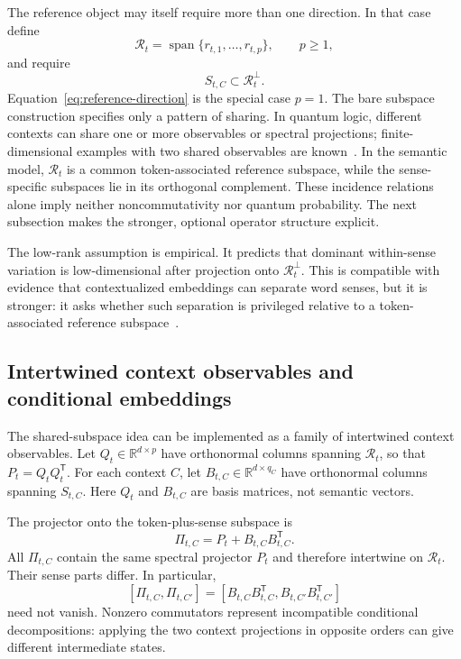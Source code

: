 \documentclass[
  aps,
  reprint,
  superscriptaddress,
  floatfix,
  nofootinbib,
  longbibliography
]{revtex4-2}
\newcommand{\R}{\mathbb{R}}
\newcommand{\T}{^{\mathsf{T}}}
\DeclareMathOperator{\spanop}{span}
\begin{document}
The reference object may itself require more than one direction. In that
case define
%
\begin{equation}
\label{eq:reference-subspace}
\mathcal R_t=
\spanop\{r_{t,1},\dots,r_{t,p}\},
\qquad p\ge1,
\end{equation}
%
and require
%
\begin{equation}
\label{eq:multi-sense-subspace}
S_{t,C}\subset\mathcal R_t^\perp .
\end{equation}
%
Equation~\eqref{eq:reference-direction} is the special case $p=1$.
The bare subspace construction specifies only a pattern of sharing. In
quantum logic, different contexts can share one or more observables or
spectral projections; finite-dimensional examples with two shared
observables are known~\cite{svozil:040102}. In the semantic model,
$\mathcal R_t$ is a common token-associated reference subspace, while the
sense-specific subspaces lie in its orthogonal complement. These incidence
relations alone imply neither noncommutativity nor quantum probability. The
next subsection makes the stronger, optional operator structure explicit.

The low-rank assumption is empirical. It predicts that dominant
within-sense variation is low-dimensional after projection onto
$\mathcal R_t^\perp$. This is compatible with evidence that contextualized
embeddings can separate word senses, but it is stronger: it asks whether
such separation is privileged relative to a token-associated reference
subspace~\cite{wiedemann2019does,scarlini2020ares}.

\subsection{Intertwined context observables and conditional embeddings}
\label{sec:observables}

The shared-subspace idea can be implemented as a family of intertwined
context observables.  Let $Q_t\in\R^{d\times p}$ have orthonormal columns
spanning $\mathcal R_t$, so that $P_t=Q_tQ_t\T$.  For each context $C$, let
$B_{t,C}\in\R^{d\times q_C}$ have orthonormal columns spanning $S_{t,C}$.
Here $Q_t$ and $B_{t,C}$ are basis matrices, not semantic vectors.

The projector onto the token-plus-sense subspace is
%
\begin{equation}
\label{eq:context-projector}
\Pi_{t,C}=P_t+B_{t,C}B_{t,C}\T .
\end{equation}
%
All $\Pi_{t,C}$ contain the same spectral projector $P_t$ and therefore
intertwine on $\mathcal R_t$.  Their sense parts differ.  In particular,
%
\begin{equation}
\label{eq:projector-commutator}
[\Pi_{t,C},\Pi_{t,C'}]
=
[B_{t,C}B_{t,C}\T,B_{t,C'}B_{t,C'}\T]
\end{equation}
%
need not vanish.  Nonzero commutators represent incompatible conditional
decompositions: applying the two context projections in opposite orders can
give different intermediate states.
\end{document}
